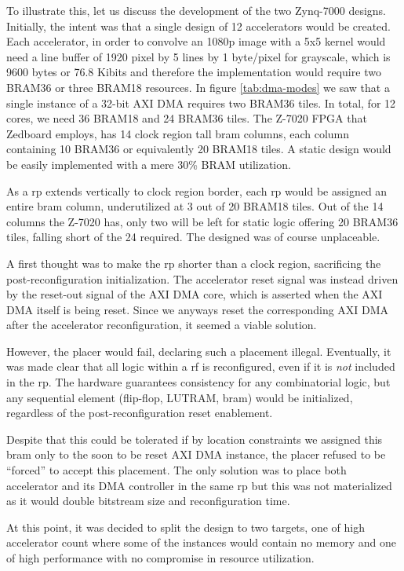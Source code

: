 To illustrate this, let us discuss the development of the two Zynq-7000 designs.
Initially, the intent was that a single design of 12 accelerators would be created.
Each accelerator, in order to convolve an 1080p image with a 5x5 kernel would need
a line buffer of 1920 pixel by 5 lines by 1 byte/pixel for grayscale, which is 9600 bytes
or 76.8 Kibits and therefore the implementation would require
two BRAM36 or three BRAM18 resources. In figure \ref{tab:dma-modes} we saw that a single
instance of a 32-bit AXI DMA requires two BRAM36 tiles. In total, for 12 cores,
we need 36 BRAM18 and 24 BRAM36 tiles. The Z-7020 FPGA that Zedboard employs,
has 14 clock region tall \gls{bram} columns, 
each column containing 10 BRAM36 or equivalently 20 BRAM18 tiles.
A static design would be easily implemented with a mere 30\% BRAM utilization.

As a \gls{rp} extends vertically to clock region border, each \gls{rp}
would be assigned an entire \gls{bram} column, underutilized at 3 out of 20 BRAM18 tiles.
Out of the 14 columns the Z-7020 has, only two will be left for static logic offering 20 BRAM36 tiles,
falling short of the 24 required. The designed was of course unplaceable.

A first thought was to make the \gls{rp} shorter than a clock region,
sacrificing the post-reconfiguration initialization. 
The accelerator reset signal was instead driven by the reset-out signal of the AXI DMA core, 
which is asserted when the AXI DMA itself is being reset.
Since we anyways reset the corresponding AXI DMA after the accelerator reconfiguration, 
it seemed a viable solution. 

However, the placer would fail, declaring such a placement illegal.
Eventually, it was made clear that all logic within a \gls{rf}
is reconfigured, even if it is \emph{not} included in the \gls{rp}.
The hardware guarantees consistency for any combinatorial logic,
but any sequential element (flip-flop, LUTRAM, \gls{bram}) would be initialized,
regardless of the post-reconfiguration reset enablement.

Despite that this could be tolerated if by location constraints we assigned this \gls{bram}
only to the soon to be reset AXI DMA instance, the placer refused to be ``forced'' to accept
this placement. The only solution was to place both accelerator and its DMA controller in
the same \gls{rp} but this was not materialized as it would 
double bitstream size and reconfiguration time. 

At this point, it was decided to split the design
to two targets, one of high accelerator count where some of the instances would contain no memory
and one of high performance with no compromise in resource utilization.

